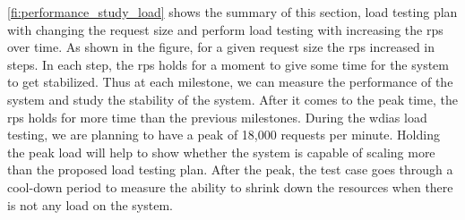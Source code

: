 \cref{fi:performance_study_load} shows the summary of this section, load testing plan with changing the request size and perform load testing with increasing the \acrshort{rps} over time. As shown in the figure, for a given request size the \acrshort{rps} increased in steps. In each step, the \acrshort{rps} holds for a moment to give some time for the system to get stabilized. Thus at each milestone, we can measure the performance of the system and study the stability of the system. After it comes to the peak time, the \acrshort{rps} holds for more time than the previous milestones. During the \acrshort{wdias} load testing, we are planning to have a peak of 18,000 requests per minute. Holding the peak load will help to show whether the system is capable of scaling more than the proposed load testing plan. After the peak, the test case goes through a cool-down period to measure the ability to shrink down the resources when there is not any load on the system.

